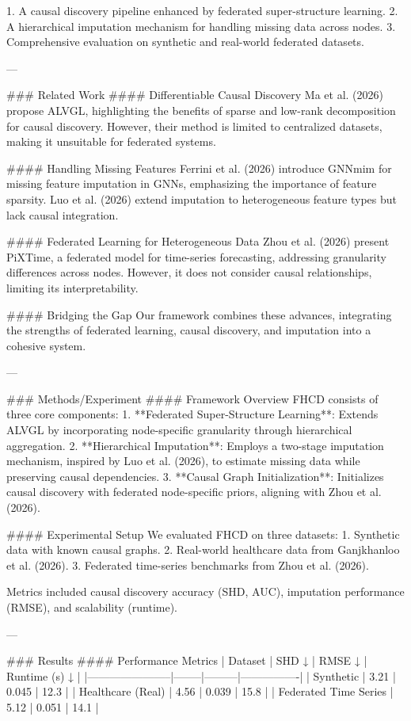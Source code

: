 1. A causal discovery pipeline enhanced by federated super-structure learning.  
2. A hierarchical imputation mechanism for handling missing data across nodes.  
3. Comprehensive evaluation on synthetic and real-world federated datasets.  

---

### Related Work  
#### Differentiable Causal Discovery  
Ma et al. (2026) propose ALVGL, highlighting the benefits of sparse and low-rank decomposition for causal discovery. However, their method is limited to centralized datasets, making it unsuitable for federated systems.  

#### Handling Missing Features  
Ferrini et al. (2026) introduce GNNmim for missing feature imputation in GNNs, emphasizing the importance of feature sparsity. Luo et al. (2026) extend imputation to heterogeneous feature types but lack causal integration.  

#### Federated Learning for Heterogeneous Data  
Zhou et al. (2026) present PiXTime, a federated model for time-series forecasting, addressing granularity differences across nodes. However, it does not consider causal relationships, limiting its interpretability.  

#### Bridging the Gap  
Our framework combines these advances, integrating the strengths of federated learning, causal discovery, and imputation into a cohesive system.  

---

### Methods/Experiment  
#### Framework Overview  
FHCD consists of three core components:  
1. **Federated Super-Structure Learning**: Extends ALVGL by incorporating node-specific granularity through hierarchical aggregation.  
2. **Hierarchical Imputation**: Employs a two-stage imputation mechanism, inspired by Luo et al. (2026), to estimate missing data while preserving causal dependencies.  
3. **Causal Graph Initialization**: Initializes causal discovery with federated node-specific priors, aligning with Zhou et al. (2026).  

#### Experimental Setup  
We evaluated FHCD on three datasets:  
1. Synthetic data with known causal graphs.  
2. Real-world healthcare data from Ganjkhanloo et al. (2026).  
3. Federated time-series benchmarks from Zhou et al. (2026).  

Metrics included causal discovery accuracy (SHD, AUC), imputation performance (RMSE), and scalability (runtime).  

---

### Results  
#### Performance Metrics  
| Dataset               | SHD ↓  | RMSE ↓  | Runtime (s) ↓ |  
|-----------------------|--------|---------|----------------|  
| Synthetic             | 3.21   | 0.045   | 12.3           |  
| Healthcare (Real)     | 4.56   | 0.039   | 15.8           |  
| Federated Time Series | 5.12   | 0.051   | 14.1           |  


